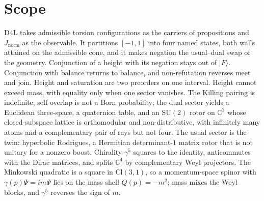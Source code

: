 \documentclass[a4paper]{article}
\theoremstyle{definition}
\newcommand{\Jnorm}{J_{\mathrm{norm}}}
\begin{document}
\section{Scope}
\label{sec:claims}

D4L takes admissible torsion configurations as the carriers of
propositions and \(\Jnorm\) as the observable. It partitions
\([-1,1]\) into four named states, both walls attained on the
admissible cone, and it makes negation the usual--dual swap of the
geometry. Conjunction of a height with its negation stays out of
\(\lvert F\rangle\). Conjunction with balance returns to balance,
and non-refutation reverses meet and join. Height and saturation are two preorders on one
interval. Height cannot exceed mass, with equality only when one
sector vanishes. The Killing pairing is indefinite; self-overlap is
not a Born probability; the dual sector yields a Euclidean
three-space, a quaternion table, and an \(\mathrm{SU}(2)\) rotor on
\(\mathbb{C}^2\) whose closed-subspace lattice is orthomodular and
non-distributive, with infinitely many atoms and a complementary pair
of rays but not four. The usual sector is the twin: hyperbolic
Rodrigues, a Hermitian determinant-\(1\) matrix rotor that is not
unitary for a nonzero boost. Chirality \(\gamma^5\) squares to the
identity, anticommutes with the Dirac matrices, and splits
\(\mathbb{C}^4\) by complementary Weyl projectors. The Minkowski
quadratic is a square in \(\mathrm{Cl}(3,1)\), so a momentum-space
spinor with \(\gamma(p)\Psi=im\Psi\) lies on the mass shell
\(Q(p)=-m^2\); mass mixes the Weyl blocks, and \(\gamma^5\) reverses
the sign of \(m\).
\end{document}

